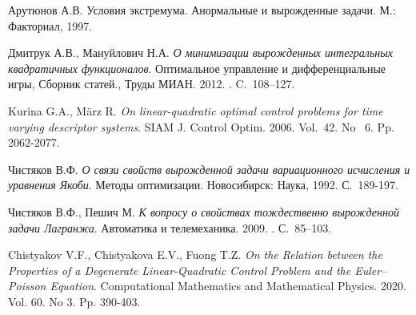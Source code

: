 \begin{thebibliography}{99}

 Арутюнов А.В. Условия экстремума. Анормальные и вырожденные
задачи. М.: Факториал, 1997.

Дмитрук А.В.,  Мануйлович Н.А. {\it О минимизации вырожденных интегральных квадратичных функционалов}. Оптимальное управление и дифференциальные игры, Сборник статей., Труды МИАН. 2012. .  C.~108–127.

 Kurina G.A., M{\"a}rz R. {\it On linear-quadratic optimal control
problems for time varying descriptor systems}. SIAM J. Control Optim. 2006. Vol.~42. No ~6. Pp. 2062-2077.

Чистяков В.Ф. {\it О связи свойств вырожденной задачи вариационного исчисления и уравнения Якоби}.  Методы оптимизации. Новосибирск: Наука, 1992. С.~189-197.

Чистяков В.Ф., Пешич М. {\it К вопросу о свойствах тождественно вырожденной задачи Лагранжа}. 
Автоматика и телемеханика. 2009. . С.~85–103.

Chistyakov V.F., Chistyakova E.V., Fuong T.Z. {\it On the Relation between the Properties of a Degenerate Linear-Quadratic Control Problem and the Euler–Poisson Equation}. Computational Mathematics and Mathematical Physics. 2020. Vol. 60. No 3. Pp. 390-403. 
	


\end{thebibliography}






%

